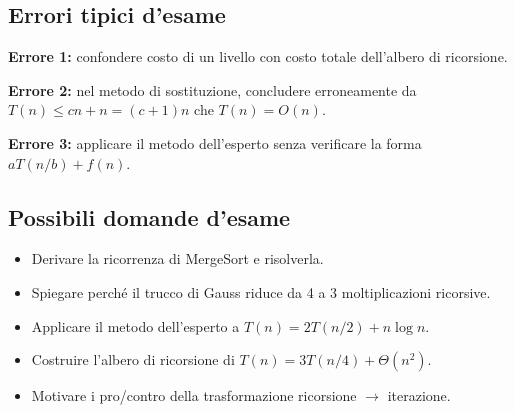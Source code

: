 \subsection{Errori tipici d'esame}
\begin{hardnote}
\textbf{Errore 1:} confondere costo di un livello con costo totale dell'albero di ricorsione.
\end{hardnote}

\begin{hardnote}
\textbf{Errore 2:} nel metodo di sostituzione, concludere erroneamente da
$T(n)\le cn+n=(c+1)n$ che $T(n)=O(n)$.
\end{hardnote}

\begin{hardnote}
\textbf{Errore 3:} applicare il metodo dell'esperto senza verificare la forma $aT(n/b)+f(n)$.
\end{hardnote}

\subsection{Possibili domande d'esame}
\begin{itemize}
	\item Derivare la ricorrenza di MergeSort e risolverla.
	\item Spiegare perché il trucco di Gauss riduce da 4 a 3 moltiplicazioni ricorsive.
	\item Applicare il metodo dell'esperto a $T(n)=2T(n/2)+n\log n$.
	\item Costruire l'albero di ricorsione di $T(n)=3T(n/4)+\Theta(n^2)$.
	\item Motivare i pro/contro della trasformazione ricorsione $\rightarrow$ iterazione.
\end{itemize}
